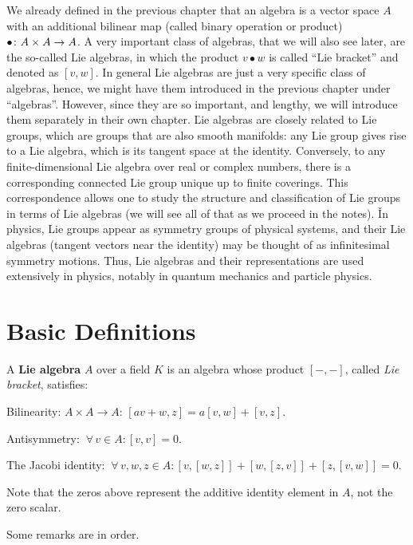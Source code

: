 We already defined in the previous chapter that an algebra is a vector space $A$ with an additional bilinear map
(called binary operation or product) $\bullet \colon A\times A \to A$. A very important class of algebras, that we will
also see later, are the so-called Lie algebras, in which the product $v \bullet w$ is called ``Lie bracket'' and
denoted as $[v,w]$. In general Lie algebras are just a very specific class of algebras, hence, we might have them
introduced in the previous chapter under ``algebras''. However, since they are so important, and lengthy, we will
introduce them separately in their own chapter. \v

Lie algebras are closely related to Lie groups, which are groups that are also smooth manifolds: any Lie group gives
rise to a Lie algebra, which is its tangent space at the identity. Conversely, to any finite-dimensional Lie algebra
over real or complex numbers, there is a corresponding connected Lie group unique up to finite coverings. This
correspondence allows one to study the structure and classification of Lie groups in terms of Lie algebras (we will
see all of that as we proceed in the notes). \v

In physics, Lie groups appear as symmetry groups of physical systems, and their Lie algebras (tangent vectors near
the identity) may be thought of as infinitesimal symmetry motions. Thus, Lie algebras and their representations are
used extensively in physics, notably in quantum mechanics and particle physics.

\section{Basic Definitions}

A \textbf{Lie algebra} $A$ over a field $K$ is an algebra whose product $[-,-]$, called \emph{Lie bracket}, satisfies:
\ben[label=\roman*)]
\item Bilinearity: $A \times A \to A$: $[av+w,z]= a [v,w] + [v,z]$.
\item Antisymmetry: $\ \forall\, v\in A : [v,v]=0.$
\item The Jacobi identity: $\ \forall\, v,w,z\in A : [v,[w,z]] + [w,[z,v]] + [z,[v,w]] = 0.$
\een

Note that the zeros above represent the additive identity element in $A$, not the zero scalar.
\ed

Some remarks are in order.

